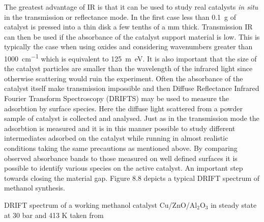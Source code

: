 The greatest advantage of IR is that it can be used to study real catalysts {\it in situ} in the transmission or reflectance mode. In the first case less than \SI{0.1}{g} of catalyst is  pressed into a thin disk a few tenths of a \si{mm} thick. Transmission IR can then be used if the absorbance of the catalyst support material is low. This is typically the case when using oxides and considering wavenumbers greater than \SI{1000}{cm^{-1}} which is equivalent to \SI{125}{m\electronvolt}. It is also important that the size of the catalyst particles are smaller than the wavelength of the infrared light since otherwise scattering would ruin the experiment. Often the absorbance of the catalyst itself make transmission impossible and then Diffuse Reflectance Infrared  Fourier Transform Spectroscopy (DRIFTS) may be used to measure the adsorbtion by surface species. Here the diffuse light scattered from a powder sample of catalyst is collected and analysed. Just as in the transmission mode the adsorbtion is measured and it is in this manner possible to study different intermediates adsorbed on the catalyst while running in almost realistic conditions taking the same precautions as mentioned above. By comparing observed absorbance bands to those measured on well defined surfaces it is possible to identify various species on the active catalyst. An important step towards closing the material gap. Figure 8.8 depicts a typical DRIFT spectrum of  methanol synthesis.

\vspace*{11cm}

 DRIFT spectrum of a working methanol catalyst Cu/ZnO/Al$_{2}$O$_{3}$  in steady state at 30 bar and 413 K taken from \cite{Bailey}
\vspace{1cm} 